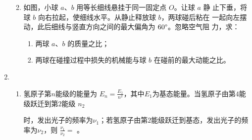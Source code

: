 \begin{enumerate}
\begin{enumerate}

\item 
如图，小球 $ a $、$ b $ 用等长细线悬挂于同一固定点 $ O $。让球 $ a $ 静
止下垂，将球 $ b $ 向右拉起，使细线水平。从静止释放球 $ b $，两球碰后粘在
一起向左摆动，此后细线与竖直方向之间的最大偏角为 $ 60 \degree $。忽略空气阻
力，求：
\begin{enumerate}
	\item
两球 $ a $、$ b $ 的质量之比；
\item 
两球在碰撞过程中损失的机械能与球 $ b $ 在碰前的最大动能之比。
\end{enumerate}
\begin{figure}[h!]
	\flushright
	
\end{figure}


	
\end{enumerate}


\item 
{}
\begin{enumerate}
	\item
氢原子第$ n $能级的能量为 $E_{n}=\frac{E_{1}}{n^{2}}$，其中$ E_{1} $为基态能量。当氢原子由第$ 4 $能级跃迁到第$ 2 $能级
$ n_{2} $

时，发出光子的频率为$ \nu_{1} $；若氢原子由第$ 2 $能级跃迁到基态，发出光子的频率为$ \nu_{2} $，则
$\frac{\nu_{1}}{\nu_{2}}=$ \underlinegap 。


\end{enumerate}
\end{enumerate}
